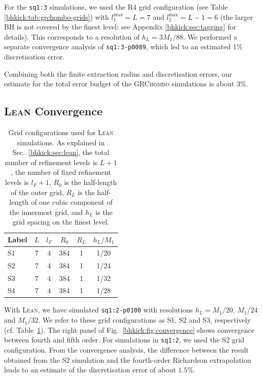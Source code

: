 For the \texttt{sq1:3} simulations, we used the R4 grid configuration
(see Table \ref{bhkick:tab:grchombo-grids}) with $l_1^{\max}=L=7$ and
$l_2^{\max}=L-1=6$ (the larger BH is not covered by the finest level:
see Appendix \ref{bhkick:sec:tagging} for details). This corresponds to a
resolution of $h_L=3M_1/88$. We performed a separate convergence
analysis of \texttt{sq1:3-p0089}, which led to an estimated 1\%
discretisation error.

Combining both the finite extraction radius and discretisation errors,
our estimate for the total error budget of the \textsc{GRChombo}
simulations is about $3\%$.


\subsection{\textsc{Lean} Convergence}
\begin{table}[b]

    \caption{Grid configurations used for \textsc{Lean} simulations. As
    explained in Sec.~\ref{bhkick:sec:lean}, the total number of refinement
    levels is $L+1$, the number of fixed refinement levels is $l_F+1$,
    $R_0$ is the half-length of the outer grid, $R_L$ is the half-length
    of one cubic component of the innermost grid, and $h_L$ is the grid
    spacing on the finest level.}
    \centering
    \begin{tabular}{lccccc} \hline
        Label & $L$ & $l_F$ & $R_0$ & $R_L$ & $h_L/M_1$\\
        \hline
        S1 & 7 & 4 & 384 & 1 & 1/20\\
        S2 & 7 & 4 & 384 & 1 & 1/24\\
        S3 & 7 & 4 & 384 & 1 & 1/32\\
        S4 & 7 & 4 & 384 & 1 & 1/28\\ \hline
    \end{tabular}

    \label{bhkick:tab:lean-grids}
\end{table}

With \textsc{Lean}, we have simulated \texttt{sq1:2-p0100} with
resolutions $h_L = M_1/20$, $M_1/24$ and $M_1/32$. We refer to these
grid configurations as S1, S2 and S3, respectively
(cf. Table~\ref{bhkick:tab:lean-grids}). The right panel of Fig.~\ref{bhkick:fig:convergence}
shows convergence between fourth and fifth order. For simulations in
\texttt{sq1:2}, we used the S2 grid configuration. From the
convergence analysis, the difference between the result obtained from
the S2 simulation and the fourth-order Richardson extrapolation leads
to an estimate of the discretisation error of about $1.5\%$.

